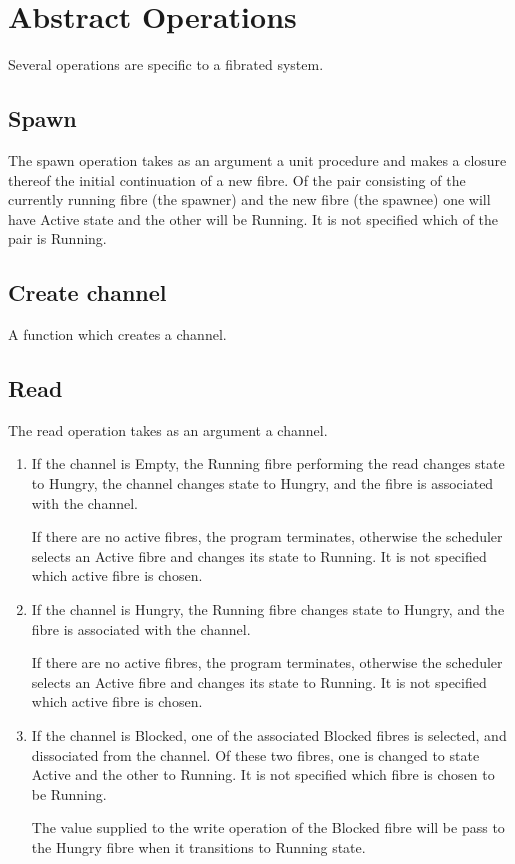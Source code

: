 \documentclass{article}
\begin{document}
\section{Abstract Operations}
Several operations are specific to a fibrated system.
\subsection{Spawn} 
The spawn operation takes as an argument a unit procedure and makes
a closure thereof the initial continuation
of a new fibre.  Of the pair consisting of the currently running
fibre (the spawner) and the new fibre (the spawnee) one will have Active
state and the other will be Running. It is not specified which
of the pair is Running.

\subsection{Create channel}
A function which creates a channel.

\subsection{Read}
The read operation takes as an argument a channel.

\begin{enumerate}
\item If the channel is Empty, the Running fibre performing the read
changes state to Hungry, the channel changes state to Hungry,
and the fibre is associated with the channel.

If there are no active fibres, the program terminates,
otherwise the scheduler selects an Active fibre and
changes its state to Running.  It is not specified which active 
fibre is chosen.

\item If the channel is Hungry, the Running fibre changes state
to Hungry, and the fibre is associated with the channel.

If there are no active fibres, the program terminates,
otherwise the scheduler selects an Active fibre and
changes its state to Running.  It is not specified which active 
fibre is chosen.

\item If the channel is Blocked, one of the associated Blocked fibres
is selected, and dissociated from the channel. Of these two
fibres, one is changed to state Active and the other to Running.
It is not specified which fibre is chosen to be Running.

The value supplied to the write operation of the Blocked
fibre will be pass to the Hungry fibre when it transitions
to Running state.
\end{enumerate}
\end{document}
